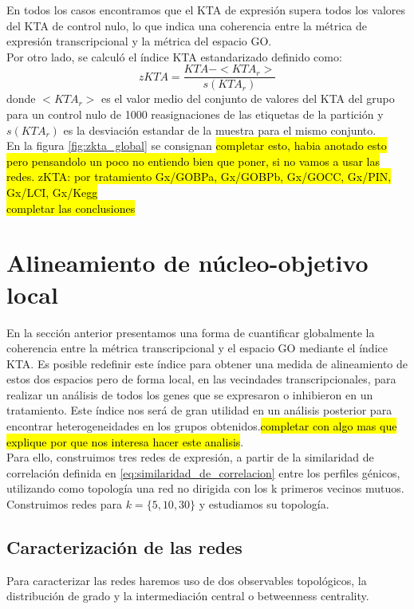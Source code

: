 En todos los casos encontramos que el KTA de expresión supera todos los valores del KTA de control nulo, lo que indica una coherencia entre la métrica de expresión transcripcional y la métrica del espacio GO.\\
Por otro lado, se calculó el índice KTA estandarizado definido como:
\begin{equation}
	zKTA = \frac{KTA-<KTA_r>}{s(KTA_r)}
\end{equation}
donde $<KTA_r>$ es el valor medio del conjunto de valores del KTA del grupo para un control nulo de 1000 reasignaciones de las etiquetas de la partición y $s(KTA_r)$ es la desviación estandar de la muestra para el mismo conjunto.\\
En la figura \ref{fig:zkta_global} se consignan \hl{completar esto, habia anotado esto pero pensandolo un poco no entiendo bien que poner, si no vamos a usar las redes. zKTA: por tratamiento Gx/GOBPa, Gx/GOBPb, Gx/GOCC, Gx/PIN, Gx/LCI, Gx/Kegg}\\
\hl{completar las conclusiones}
\section{Alineamiento de núcleo-objetivo local}
En la sección anterior presentamos una forma de cuantificar globalmente la coherencia entre la métrica transcripcional y el espacio GO mediante el índice KTA. Es posible redefinir este índice para obtener una medida de alineamiento de estos dos espacios pero de forma local, en las vecindades transcripcionales, para realizar un análisis de todos los genes que se expresaron o inhibieron en un tratamiento. Este índice nos será de gran utilidad en un análisis posterior para encontrar heterogeneidades en los grupos obtenidos.\hl{completar con algo mas que explique por que nos interesa hacer este analisis}.\\
Para ello, construimos tres redes de expresión, a partir de la similaridad de correlación definida en 	\ref{eq:similaridad_de_correlacion} entre los perfiles génicos, utilizando como topología una red no dirigida con los k primeros vecinos mutuos. Construimos redes para $k=\{5, 10, 30\}$ y estudiamos su topología.\\
\subsection{Caracterización de las redes}
Para caracterizar las redes haremos uso de dos observables topológicos, la distribución de grado y la intermediación central o betweenness centrality.\\
